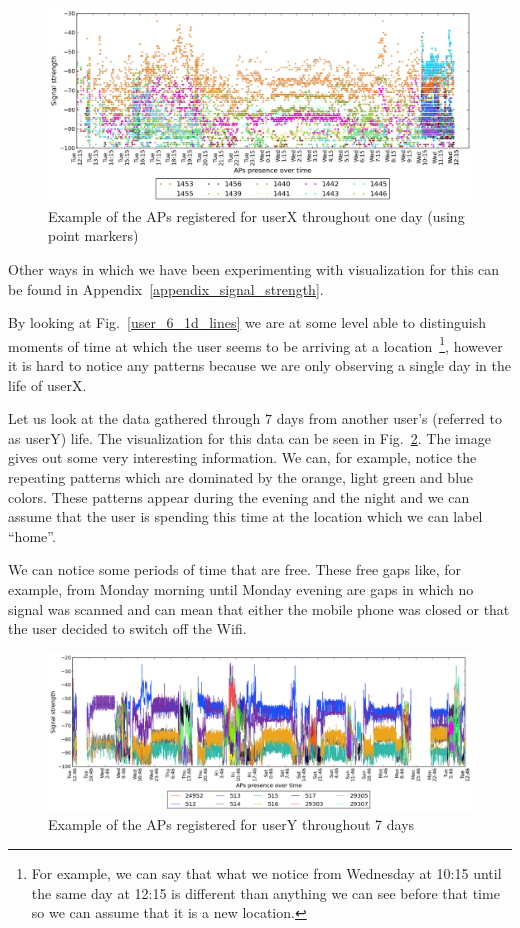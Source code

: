 \begin{figure}[h]
\centering
\includegraphics[width
=\textwidth, height =
0.4\textwidth]{figures/point_user_6_sorted_1days_plot.png}
\caption{Example of the APs registered for userX throughout one day (using
point markers)}
\label{user_6_1d_point}
\end{figure}

Other ways in which we have been experimenting with visualization for this can
be found in Appendix~\ref{appendix_signal_strength}.

By looking at Fig.~\ref{user_6_1d_lines} we are at some level able to
distinguish moments of time at which the user seems to be arriving at a
location~\footnote{For example, we can say that what we notice from Wednesday
at 10:15 until the same day at 12:15 is different than anything we can see
before that time so we can assume that it is a new location.}, however it is
hard to notice any patterns because we are only observing a single day in the
life of userX. 

Let us look at the data gathered through $7$ days from another user's (referred
to as userY) life. The visualization for this data can be seen in
Fig.~\ref{user_3_7d}. The image gives out some very interesting information. We
can, for example, notice the repeating patterns which are dominated by the
orange, light green and blue colors. These patterns appear during the evening
and the night and we can assume that the user is spending this time at the
location which we can label ``home''.

We can notice some periods of time that are free. These free gaps like, for
example, from Monday morning until Monday evening are gaps in which no signal
was scanned and can mean that either the mobile phone was closed or that the
user decided to switch off the Wifi.

\begin{figure}[h]
\centering
\includegraphics[width
=\textwidth, height =
0.4\textwidth]{figures/user_3_sorted_7days_plot.png}
\caption{Example of the APs registered for userY throughout 7 days}
\label{user_3_7d}
\end{figure}

